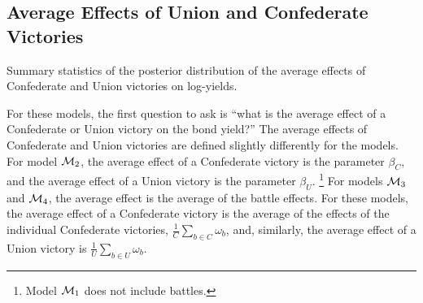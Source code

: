 \subsection{Average Effects of Union and Confederate Victories}
\label{sec:future-battles}

\begin{table}
  \centering
  
  \caption{Summary statistics of the posterior distribution of the average effects of Confederate and Union victories on log-yields.}
  \label{bonds:tab:avg_battle_effects}
\end{table}

For these models, the first question to ask is ``what is the average effect of a Confederate or Union victory on the bond yield?''
The average effects of Confederate and Union victories are defined slightly differently for the models.
For model $\mathcal{M}_{\text{2}}$, the average effect of a Confederate victory is the parameter $\beta_{C}$, and the average effect of a Union victory is the parameter $\beta_{U}$.%
\footnote{Model $\mathcal{M}_{\text{1}}$ does not include battles.}
For models $\mathcal{M}_{\text{3}}$ and $\mathcal{M}_{\text{4}}$, the average effect is the average of the battle effects.
For these models, the average effect of a Confederate victory is the average of the effects of the individual Confederate victories, $\frac{1}{C}\sum_{b \in C} \omega_{b}$, and, similarly, the average effect of a Union victory is $\frac{1}{U}\sum_{b \in U} \omega_{b}$.

